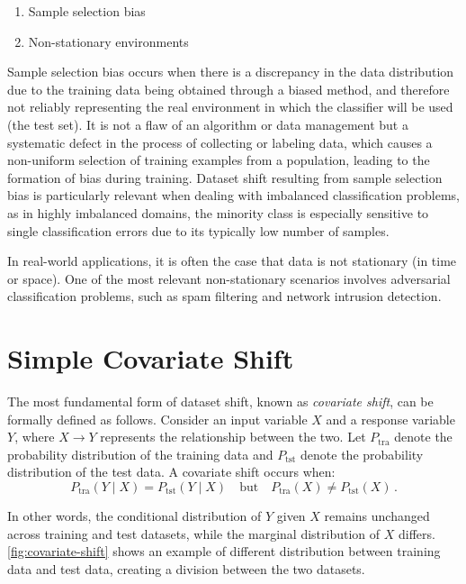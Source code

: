 \begin{enumerate}
	\item Sample selection bias
	\item Non-stationary environments
\end{enumerate}

Sample selection bias occurs when there is a discrepancy in the data distribution due to the training data being obtained through a biased method, and therefore not reliably representing the real environment in which the classifier will be used (the test set). It is not a flaw of an algorithm or data management but a systematic defect in the process of collecting or labeling data, which causes a non-uniform selection of training examples from a population, leading to the formation of bias during training. Dataset shift resulting from sample selection bias is particularly relevant when dealing with imbalanced classification problems, as in highly imbalanced domains, the minority class is especially sensitive to single classification errors due to its typically low number of samples. 

In real-world applications, it is often the case that data is not stationary (in time or space). One of the most relevant non-stationary scenarios involves adversarial classification problems, such as spam filtering and network intrusion detection.
	

\section{Simple Covariate Shift}

The most fundamental form of dataset shift, known as \textit{covariate shift}, can be formally defined as follows. Consider an input variable \( X \) and a response variable \( Y \), where \( X \to Y \) represents the relationship between the two. Let \( P_{\text{tra}} \) denote the probability distribution of the training data and \( P_{\text{tst}} \) denote the probability distribution of the test data. A covariate shift occurs when:  
\[
P_{\text{tra}}(Y \mid X) = P_{\text{tst}}(Y \mid X) \quad \text{but} \quad P_{\text{tra}}(X) \neq P_{\text{tst}}(X)\,.
\]

In other words, the conditional distribution of \( Y \) given \( X \) remains unchanged across training and test datasets, while the marginal distribution of \( X \) differs. \cref{fig:covariate-shift} shows an example of different distribution between training data and test data, creating a division between the two datasets.  
	

